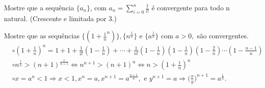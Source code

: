 \documentclass[analysis_notes.tex]{subfiles}
\begin{document}
\begin{example}
	Mostre que a sequência $\{a_{n}\}$, com $a_{n} = \displaystyle \sum\limits_{i=0}^{n}\frac{1}{i!}$ é convergente para todo n natural. (Crescente e limitada por 3.)
\end{example}
\begin{example}
	Mostre que as sequências $\biggl\{(1+\frac{1}{n}^{n})\biggr\}, \{n^{\frac{1}{n}}\}$ e $\{a^{\frac{1}{n}}\}$ com $a >0,$ s\~ao
	convergentes.
	\begin{align*}
		 & \circ (1+\frac{1}{n})^{n} = 1 + 1 + \frac{1}{2!}(1-\frac{1}{n}) + \cdots + \frac{1}{n!}(1-\frac{1}{n})(1-\frac{1}{n})(1-\frac{2}{n})\cdots(1-\frac{n-1}{n})        \\
		 & \circ n^{\frac{1}{n}} > (n+1)^{\frac{1}{n+1}}\Longleftrightarrow n^{n+1} > (n+1)^{n}\Longleftrightarrow n>(1+\frac{1}{n})^{n}                                      \\
		 & \circ x = a^{n} < 1\Rightarrow x < 1, x^{n} = a, x^{n+1} = a^{\frac{n+1}{n}},\text{ e } y^{n+1} = a \Rightarrow \biggl(\frac{x}{y}\biggr)^{n+1} = a^{\frac{1}{n}}.
	\end{align*}
\end{example}
\end{document}

